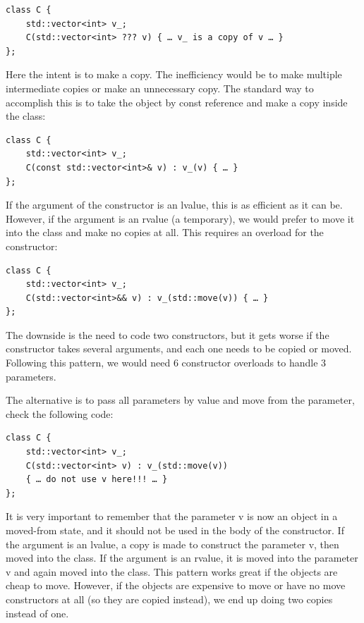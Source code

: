 \begin{lstlisting}[style=styleCXX]
class C {
	std::vector<int> v_;
	C(std::vector<int> ??? v) { … v_ is a copy of v … }
};
\end{lstlisting}

Here the intent is to make a copy. The inefficiency would be to make multiple intermediate copies or make an unnecessary copy. The standard way to accomplish this is to take the object by const reference and make a copy inside the class:

\begin{lstlisting}[style=styleCXX]
class C {
	std::vector<int> v_;
	C(const std::vector<int>& v) : v_(v) { … }
};
\end{lstlisting}

If the argument of the constructor is an lvalue, this is as efficient as it can be. However, if the argument is an rvalue (a temporary), we would prefer to move it into the class and make no copies at all. This requires an overload for the constructor:

\begin{lstlisting}[style=styleCXX]
class C {
	std::vector<int> v_;
	C(std::vector<int>&& v) : v_(std::move(v)) { … }
};
\end{lstlisting}

The downside is the need to code two constructors, but it gets worse if the constructor takes several arguments, and each one needs to be copied or moved. Following this pattern, we would need 6 constructor overloads to handle 3 parameters.

The alternative is to pass all parameters by value and move from the parameter, check the following code:

\begin{lstlisting}[style=styleCXX]
class C {
	std::vector<int> v_;
	C(std::vector<int> v) : v_(std::move(v)) 
	{ … do not use v here!!! … }
};
\end{lstlisting}

It is very important to remember that the parameter v is now an object in a moved-from state, and it should not be used in the body of the constructor. If the argument is an lvalue, a copy is made to construct the parameter v, then moved into the class. If the argument is an rvalue, it is moved into the parameter v and again moved into the class. This pattern works great if the objects are cheap to move. However, if the objects are expensive to move or have no move constructors at all (so they are copied instead), we end up doing two copies instead of one. 

